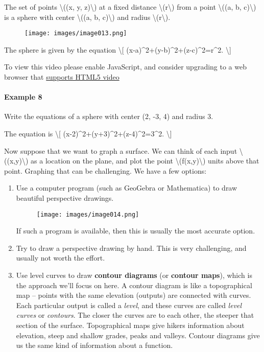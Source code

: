 The set of points \textbackslash{}((x, y, z)\textbackslash{}) at a fixed
distance \textbackslash{}(r\textbackslash{}) from a point
\textbackslash{}((a, b, c)\textbackslash{}) is a sphere with center
\textbackslash{}((a, b, c)\textbackslash{}) and radius
\textbackslash{}(r\textbackslash{}).

\begin{figure}
\centering
\texttt{[image: images/image013.png]}
\caption{}
\end{figure}

The sphere is given by the equation \textbackslash{}{[}
(x-a)\^{}2+(y-b)\^{}2+(z-c)\^{}2=r\^{}2. \textbackslash{}{]}

To view this video please enable JavaScript, and consider upgrading to a
web browser that \href{http://videojs.com/html5-video-support/}{supports
HTML5 video}

\hypertarget{example-8}{%
\paragraph{Example 8}\label{example-8}}

Write the equations of a sphere with center (2, -3, 4) and radius 3.

The equation is \textbackslash{}{[}
(x-2)\^{}2+(y+3)\^{}2+(z-4)\^{}2=3\^{}2. \textbackslash{}{]}

Now suppose that we want to graph a surface. We can think of each input
\textbackslash{}((x,y)\textbackslash{}) as a location on the plane, and
plot the point \textbackslash{}(f(x,y)\textbackslash{}) units above that
point. Graphing that can be challenging. We have a few options:

\begin{enumerate}
\item
  Use a computer program (such as GeoGebra or Mathematica) to draw
  beautiful perspective drawings.

  \begin{figure}
  \centering
  \texttt{[image: images/image014.png]}
  \caption{}
  \end{figure}

  If such a program is available, then this is usually the most accurate
  option.
\item
  Try to draw a perspective drawing by hand. This is very challenging,
  and usually not worth the effort.
\item
  Use level curves to draw \textbf{contour diagrams} (or \textbf{contour
  maps}), which is the approach we'll focus on here. A contour diagram
  is like a topographical map -- points with the same elevation
  (outputs) are connected with curves. Each particular output is called
  a \emph{level}, and these curves are called \emph{level curves} or
  \emph{contours}. The closer the curves are to each other, the steeper
  that section of the surface. Topographical maps give hikers
  information about elevation, steep and shallow grades, peaks and
  valleys. Contour diagrams give us the same kind of information about a
  function.
\end{enumerate}

